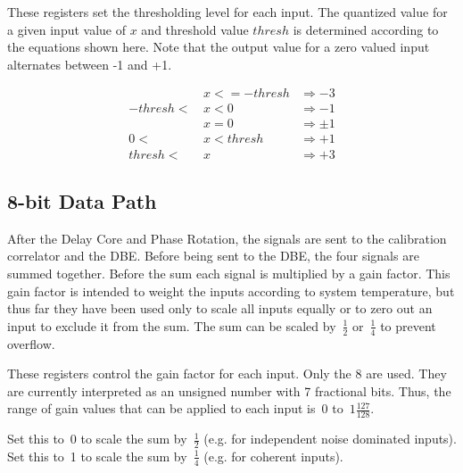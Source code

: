 \documentclass[12pt]{article}
\begin{document}
\begin{description}

\filbreak
{}
  These registers set the thresholding level for each input.
The quantized value for a given input value of $x$ and threshold value $thresh$
is determined according to the equations shown here.  Note that the output
value for a zero valued input alternates between -1 and +1.

\begin{align*}
          &\,x <= -thresh &\Rightarrow -3 \\
-thresh < &\,x < 0        &\Rightarrow -1 \\
          &\,x = 0        &\Rightarrow \pm1 \\
      0 < &\,x < thresh   &\Rightarrow +1 \\
 thresh < &\,x            &\Rightarrow +3
\end{align*}

\end{description}

  \subsection{8-bit Data Path}

After the Delay Core and Phase Rotation, the signals are sent to the
calibration correlator and the DBE.  Before being sent to the DBE, the four
signals are summed together.  Before the sum each signal is multiplied by a
gain factor.  This gain factor is intended to weight the inputs according to
system temperature, but thus far they have been used only to scale all inputs
equally or to zero out an input to exclude it from the sum.  The sum can be
scaled by~$\frac{1}{2}$ or~$\frac{1}{4}$ to prevent overflow.

\begin{description}

\filbreak
{}
 These registers control the gain factor for each input.  Only
the 8 \LSbs are used.  They are currently interpreted as an unsigned number
with 7 fractional bits.  Thus, the range of gain values that can be applied to
each input is~$0$ to~$1\frac{127}{128}$.

\end{description}

\begin{description}

 Set this to~0 to scale the sum by~$\frac{1}{2}$ (e.g. for
independent noise dominated inputs).  Set this to~1 to scale the sum
by~$\frac{1}{4}$ (e.g. for coherent inputs).

\end{description}
\end{document}
